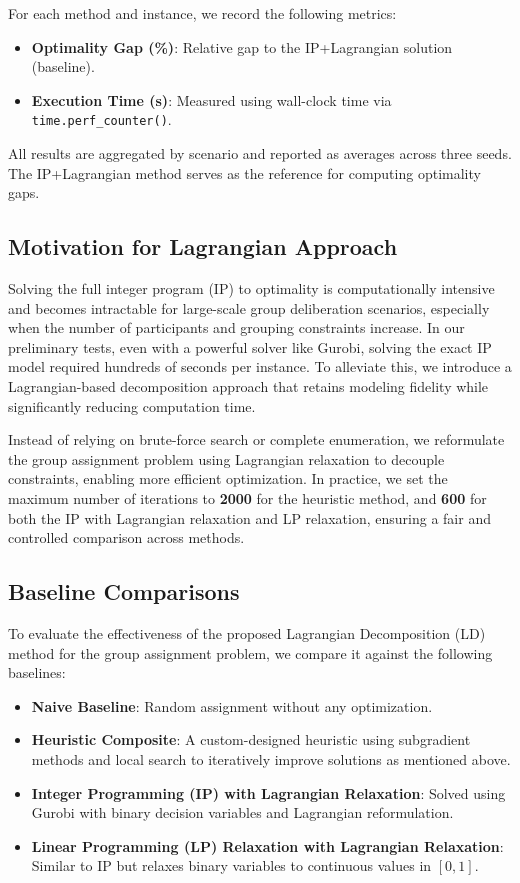 For each method and instance, we record the following metrics:
\begin{itemize}
    \item \textbf{Optimality Gap (\%)}: Relative gap to the IP+Lagrangian solution (baseline).
    \item \textbf{Execution Time (s)}: Measured using wall-clock time via \texttt{time.perf\_counter()}.
\end{itemize}

All results are aggregated by scenario and reported as averages across three seeds. The IP+Lagrangian method serves as the reference for computing optimality gaps.


\subsection{Motivation for Lagrangian Approach}

Solving the full integer program (IP) to optimality is computationally intensive and becomes intractable for large-scale group deliberation scenarios, especially when the number of participants and grouping constraints increase. In our preliminary tests, even with a powerful solver like Gurobi, solving the exact IP model required hundreds of seconds per instance. To alleviate this, we introduce a Lagrangian-based decomposition approach that retains modeling fidelity while significantly reducing computation time.

Instead of relying on brute-force search or complete enumeration, we reformulate the group assignment problem using Lagrangian relaxation to decouple constraints, enabling more efficient optimization. In practice, we set the maximum number of iterations to \textbf{2000} for the heuristic method, and \textbf{600} for both the IP with Lagrangian relaxation and LP relaxation, ensuring a fair and controlled comparison across methods.

\subsection{Baseline Comparisons}

To evaluate the effectiveness of the proposed Lagrangian Decomposition (LD) method for the group assignment problem, we compare it against the following baselines:

\begin{itemize}
    \item \textbf{Naive Baseline}: Random assignment without any optimization.
    \item \textbf{Heuristic Composite}: A custom-designed heuristic using subgradient methods and local search to iteratively improve solutions as mentioned above.
    \item \textbf{Integer Programming (IP) with Lagrangian Relaxation}: Solved using Gurobi with binary decision variables and Lagrangian reformulation.
    \item \textbf{Linear Programming (LP) Relaxation with Lagrangian Relaxation}: Similar to IP but relaxes binary variables to continuous values in $[0, 1]$.
\end{itemize}

